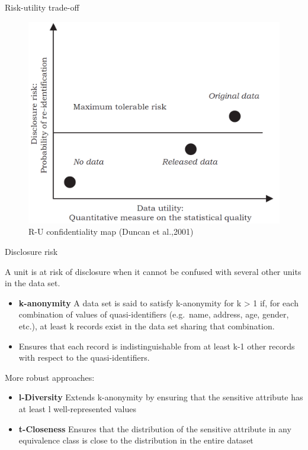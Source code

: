 \documentclass[
	aspectratio = 169
 ]{beamer}
\begin{document}
\begin{frame}{Risk-utility trade-off}

\begin{figure}
    \centering
    \includegraphics[width=0.55\linewidth
                    ]{Presentation//gallery/R-U confidentiality map.png}
    \caption{R-U confidentiality map (Duncan et al.,2001)}
\end{figure}

\end{frame}
\begin{frame}{Disclosure risk}

A unit is at risk of disclosure when it cannot be confused with several
other units in the data set.

\begin{itemize}
\item
  \textbf{k-anonymity} A data set is said to satisfy k-anonymity for k
  \textgreater{} 1 if, for each combination of values of
  quasi-identifiers (e.g.~name, address, age, gender, etc.), at least k
  records exist in the data set sharing that combination.
\item
  Ensures that each record is indistinguishable from at least k-1 other
  records with respect to the quasi-identifiers.
\end{itemize}

More robust approaches:

\begin{itemize}
\item
  \textbf{l-Diversity} Extends k-anonymity by ensuring that the
  sensitive attribute has at least l well-represented values
\item
  \textbf{t-Closeness} Ensures that the distribution of the sensitive
  attribute in any equivalence class is close to the distribution in the
  entire dataset
\end{itemize}

\end{frame}
\end{document}
